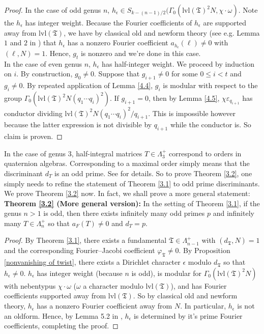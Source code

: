 \documentclass[11pt]{article}
\theoremstyle{definition}
\theoremstyle{remark}
\begin{document}
\begin{proof}
In the case of odd genus $n$, $h_\epsilon \in S_{k-(n-1)/2} (\Gamma_0(\mathrm{lvl}(\mathfrak{T})^2N, \chi \cdot \omega)$. Note the $h_\epsilon$ has integer weight. Because the Fourier coefficients of $h_\epsilon$ are supported away from $\mathrm{lvl}(\mathfrak{T})$, we have by classical old and newform theory (see e.g. Lemma $1$ and $2$ in \cite{Yamana}) that $h_\epsilon$ has a nonzero Fourier coefficient $a_{h_\epsilon}(\ell) \neq 0$ with $(\ell, N) = 1$. Hence, $g_t$ is nonzero and we're done in this case. \\

In the case of even genus $n$, $h_\epsilon$ has half-integer weight. We proceed by induction on $i$. By construction, $g_0 \neq 0$. Suppose that $g_{i+1} \neq 0$ for some $0 \leq i < t$ and $g_{i} \neq 0$. By repeated application of Lemma \ref{4.4}, $g_i$ is modular with respect to the group $\Gamma_0(\mathrm{lvl}(\mathfrak{T})^2N(q_1 \cdots q_i)^2)$. If $g_{i+1} = 0$, then by Lemma \ref{4.5}, $\chi \varepsilon_{q_{i+1}}$ has conductor dividing $\mathrm{lvl}(\mathfrak{T})^2N(q_1 \cdots q_i)^2/q_{i+1}$. This is impossible however because the latter expression is not divisible by $q_{i+1}$ while the conductor is. So claim is proven.

\end{proof}

In the case of genus $3$, half-integral matrices $T \in \Lambda_3^+$ correspond to orders in quaternion algebras. Corresponding to a maximal order simply means that the discriminant $d_T$ is an odd prime. See \cite{BD} for details. So to prove Theorem \ref{3.2}, one simply needs to refine the statement of Theorem \ref{3.1} to odd prime discriminants. We prove Theorem \ref{3.2} now. In fact, we shall prove a more general statement: \\

{\bf Theorem \ref{3.2} (More general version):} In the setting of Theorem \ref{3.1}, if the genus $n>1$ is odd, then there exists infinitely many odd primes $p$ and infinitely many $T \in \Lambda_n^+$ so that $a_F(T) \neq 0$ and $d_T = p$.

\begin{proof}
    By Theorem \ref{3.1}, there exists a fundamental $\mathfrak{T} \in \Lambda_{n-1}^+$ with $(d_\mathfrak{T},N) = 1$ and the corresponding Fourier--Jacobi coefficient $\varphi_\mathfrak{T} \neq 0$. By Proposition \ref{nonvanishing of twist}, there exists a Dirichlet character $\epsilon$ modulo $d_\mathfrak{T}$ so that $h_\epsilon \neq 0$. $h_\epsilon$ has integer weight (because $n$ is odd), is modular for $\Gamma_0(\mathrm{lvl}(\mathfrak{T})^2N)$ with nebentypus $\chi \cdot \omega$ ($\omega$ a character modulo $\mathrm{lvl}(\mathfrak{T})$), and has Fourier coefficients supported away from $\mathrm{lvl}(\mathfrak{T})$. So by classical old and newform theory, $h_\epsilon$ has a nonzero Fourier coefficient away from $N$. In particular, $h_\epsilon$ is not an oldform. Hence, by Lemma 5.2 in \cite{BD}, $h_\epsilon$ is determined by it's prime Fourier coefficients, completing the proof.
    
\end{proof}
\end{document}
